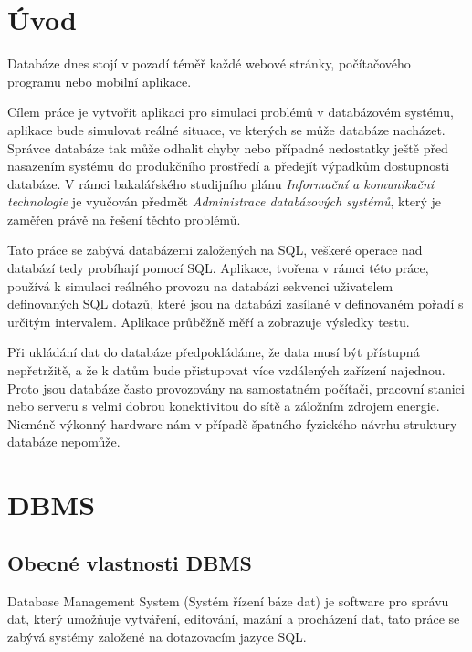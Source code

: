 \documentclass[czech,bachelor,public,dept460,male,cpdeclaration,twoside]{diploma}
\begin{document}
\MakeTitlePages


\section{Úvod}
Databáze dnes stojí v pozadí téměř každé webové stránky, počítačového programu nebo mobilní aplikace. \par
Cílem práce je vytvořit aplikaci pro simulaci problémů v databázovém systému, aplikace bude simulovat reálné situace, ve kterých se může databáze nacházet. Správce databáze tak může odhalit chyby nebo případné nedostatky ještě před nasazením systému do produkčního prostředí a předejít výpadkům dostupnosti databáze. V rámci bakalářského studijního plánu \textit{Informační a komunikační technologie} je vyučován předmět \textit{Administrace databázových systémů}, který je zaměřen právě na řešení těchto problémů.\par
Tato práce se zabývá databázemi založených na SQL, veškeré operace nad databází tedy probíhají pomocí SQL. Aplikace, tvořena v rámci této práce, používá k simulaci reálného provozu na databázi sekvenci uživatelem definovaných SQL dotazů, které jsou na databázi zasílané v definovaném pořadí s určitým intervalem. Aplikace průběžně měří a zobrazuje výsledky testu.\par
Při ukládání dat do databáze předpokládáme, že data musí být přístupná nepřetržitě, a že k datům bude přistupovat více vzdálených zařízení najednou. Proto jsou databáze často provozovány na samostatném počítači, pracovní stanici nebo serveru s velmi dobrou konektivitou do sítě a záložním zdrojem energie. Nicméně výkonný hardware nám v případě špatného fyzického návrhu struktury databáze nepomůže.

\section{DBMS} \label{dbms}
\subsection{Obecné vlastnosti DBMS}
Database Management System (Systém řízení báze dat) je software pro správu dat, který umožňuje vytváření, editování, mazání a procházení dat, tato práce se zabývá systémy založené na dotazovacím jazyce SQL.
\end{document}
